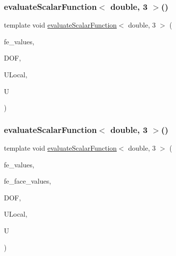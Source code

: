 \mbox{\label{function_evaluations_8cc_acf0861a6c93d4385e4738cd36457969d}} 
\subsubsection{\texorpdfstring{evaluateScalarFunction$<$ double, 3 $>$()}{evaluateScalarFunction< double, 3 >()}\hspace{0.1cm}{\footnotesize\ttfamily [1/2]}}
{\footnotesize\ttfamily template void \mbox{\hyperlink{group___evaluation_functions_ga2e2fbeb2173113c6889c73bbb7304789}{evaluate\+Scalar\+Function}}$<$ double, 3 $>$ (\begin{DoxyParamCaption}\item[{const F\+E\+Values$<$ 3 $>$ \&}]{fe\+\_\+values,  }\item[{unsigned int}]{D\+OF,  }\item[{Table$<$ 1, double $>$ \&}]{U\+Local,  }\item[{Table$<$ 1, double $>$ \&}]{U }\end{DoxyParamCaption})}

\mbox{\label{function_evaluations_8cc_ab0361b7dabb7d8e4edf83632ddb3129c}} 
\subsubsection{\texorpdfstring{evaluateScalarFunction$<$ double, 3 $>$()}{evaluateScalarFunction< double, 3 >()}\hspace{0.1cm}{\footnotesize\ttfamily [2/2]}}
{\footnotesize\ttfamily template void \mbox{\hyperlink{group___evaluation_functions_ga2e2fbeb2173113c6889c73bbb7304789}{evaluate\+Scalar\+Function}}$<$ double, 3 $>$ (\begin{DoxyParamCaption}\item[{const F\+E\+Values$<$ 3 $>$ \&}]{fe\+\_\+values,  }\item[{const F\+E\+Face\+Values$<$ 3 $>$ \&}]{fe\+\_\+face\+\_\+values,  }\item[{unsigned int}]{D\+OF,  }\item[{Table$<$ 1, double $>$ \&}]{U\+Local,  }\item[{Table$<$ 1, double $>$ \&}]{U }\end{DoxyParamCaption})}


